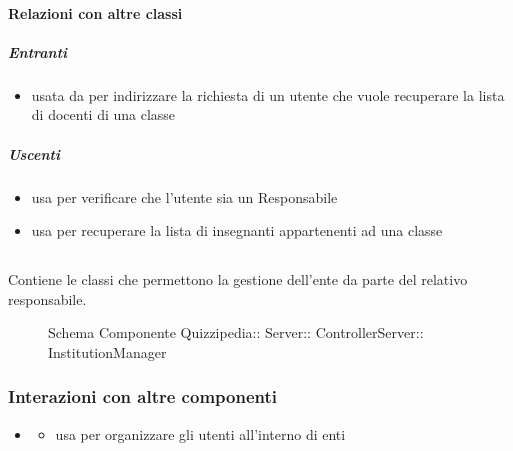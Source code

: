\paragraph{Relazioni con altre classi}
\subparagraph{Entranti}
\begin{itemize}
\item usata da  per indirizzare la richiesta di un utente che vuole recuperare la lista di docenti di una classe
\end{itemize}
\subparagraph{Uscenti}
\begin{itemize}
\item usa  per verificare che l'utente sia un Responsabile
\item usa  per recuperare la lista di insegnanti appartenenti ad una classe
\end{itemize}
\subsection{}
Contiene le classi che permettono la gestione dell'ente da parte del relativo responsabile.
\begin{figure}[H]
\centering
\noindent{}
\caption[Schema Componente InstitutionManager]{Schema Componente Quizzipedia:: Server:: ControllerServer:: InstitutionManager}
\end{figure}
\subsubsection{Interazioni con altre componenti}
\begin{itemize}
\item {}
\begin{itemize}
\item usa  per organizzare gli utenti all'interno di enti
\end{itemize}
\end{itemize}

